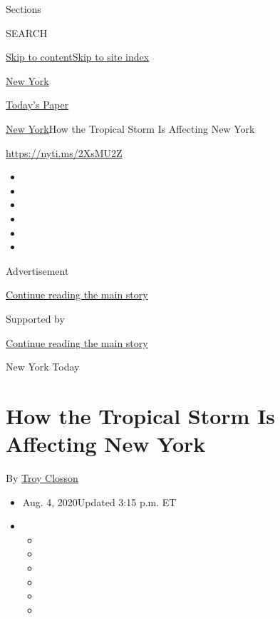 Sections

SEARCH

\protect\hyperlink{site-content}{Skip to
content}\protect\hyperlink{site-index}{Skip to site index}

\href{https://www.nytimes.com/section/nyregion}{New York}

\href{https://myaccount.nytimes.com/auth/login?response_type=cookie\&client_id=vi}{}

\href{https://www.nytimes.com/section/todayspaper}{Today's Paper}

\href{/section/nyregion}{New York}\textbar{}How the Tropical Storm Is
Affecting New York

\url{https://nyti.ms/2XsMU2Z}

\begin{itemize}
\item
\item
\item
\item
\item
\item
\end{itemize}

Advertisement

\protect\hyperlink{after-top}{Continue reading the main story}

Supported by

\protect\hyperlink{after-sponsor}{Continue reading the main story}

New York Today

\hypertarget{how-the-tropical-storm-is-affecting-new-york}{%
\section{How the Tropical Storm Is Affecting New
York}\label{how-the-tropical-storm-is-affecting-new-york}}

By \href{https://www.nytimes.com/by/troy-closson}{Troy Closson}

\begin{itemize}
\item
  Aug. 4, 2020Updated 3:15 p.m. ET
\item
  \begin{itemize}
  \item
  \item
  \item
  \item
  \item
  \item
  \end{itemize}
\end{itemize}

